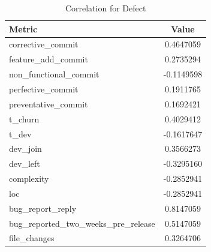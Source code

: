 \begin{table}[!hbt]
      \begin{center}
            \caption{Correlation for Defect  }
            \label{tab:correlation_defect_debt}
            \begin{tabular}{l| c}
            \toprule
            \textbf{Metric}                            & \textbf{Value}         \\ \midrule                                         
                corrective\_commit                      &              0.4647059 \\ 
                feature\_add\_commit                     &              0.2735294 \\ 
                non\_functional\_commit                  &             -0.1149598 \\ 
                perfective\_commit                      &              0.1911765 \\ 
                preventative\_commit                    &              0.1692421 \\ 
                t\_churn                                &              0.4029412 \\ 
                t\_dev                                  &             -0.1617647 \\ 
                dev\_join                               &              0.3566273 \\ 
                dev\_left                               &             -0.3295160 \\ 
                complexity                             &             -0.2852941 \\ 
                loc                                    &             -0.2852941 \\ 
                bug\_report\_reply                       &              0.8147059 \\ 
                bug\_reported\_two\_weeks\_pre\_release     &              0.5147059 \\ 
                file\_changes                           &              0.3264706 \\  \bottomrule
            \end{tabular}
      \end{center}
\end{table}

